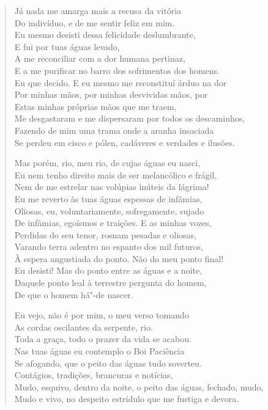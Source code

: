\begin{verse}
Já nada me amarga mais a recusa da vitória\\
Do indivíduo, e de me sentir feliz em mim.\\
Eu mesmo desisti dessa felicidade deslumbrante,\\
E fui por tuas águas levado,\\
A me reconciliar com a dor humana pertinaz,\\
E a me purificar no barro dos sofrimentos dos homens.\\
Eu que decido. E eu mesmo me reconstituí árduo na dor\\
Por minhas mãos, por minhas desvividas mãos, por\\
Estas minhas próprias mãos que me traem,\\
Me desgastaram e me dispersaram por todos os descaminhos,\\
Fazendo de mim uma trama onde a aranha insaciada\\
Se perdeu em cisco e pólen, cadáveres e verdades e ilusões.

Mas porém, rio, meu rio, de cujas águas eu nasci,\\
Eu nem tenho direito mais de ser melancólico e frágil,\\
Nem de me estrelar nas volúpias inúteis da lágrima!\\
Eu me reverto às tuas águas espessas de infâmias,\\
Oliosas, eu, voluntariamente, sofregamente, sujado\\
De infâmias, egoísmos e traições. E as minhas vozes,\\
Perdidas do seu tenor, rosnam pesadas e oliosas,\\
Varando terra adentro no espanto dos mil futuros,\\
À espera angustiada do ponto. Não do meu ponto final!\\
Eu desisti! Mas do ponto entre as águas e a noite,\\
Daquele ponto leal à terrestre pergunta do homem,\\
De que o homem há"-de nascer.

Eu vejo, não é por mim, o meu verso tomando\\
As cordas oscilantes da serpente, rio.\\
Toda a graça, todo o prazer da vida se acabou.\\
Nas tuas águas eu contemplo o Boi Paciência\\
Se afogando, que o peito das águas tudo soverteu.\\
Contágios, tradições, brancuras e notícias,\\
Mudo, esquivo, dentro da noite, o peito das águas, fechado, mudo,\\
Mudo e vivo, no despeito estrídulo que me fustiga e devora.


\end{verse}
